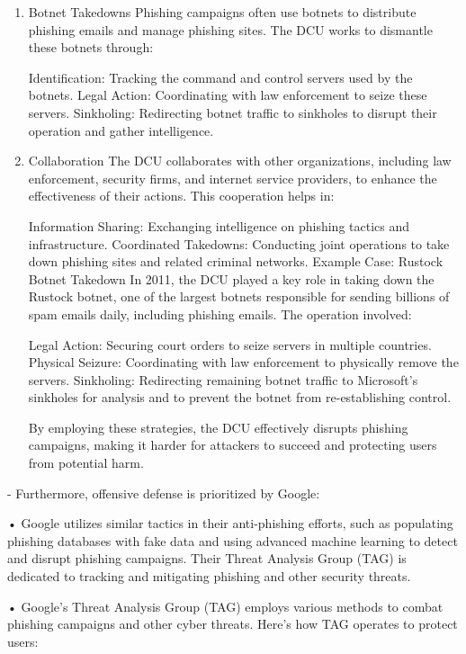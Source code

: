 \documentclass{ijitcs}
\begin{document}
\begin{itemize}
\begin{itemize}
\begin{enumerate}
    \item       Botnet Takedowns
Phishing campaigns often use botnets to distribute phishing emails and manage phishing sites. The DCU works to dismantle these botnets through:

Identification: Tracking the command and control servers used by the botnets.
Legal Action: Coordinating with law enforcement to seize these servers.
Sinkholing: Redirecting botnet traffic to sinkholes to disrupt their operation and gather intelligence.
    
    
    \item         Collaboration
The DCU collaborates with other organizations, including law enforcement, security firms, and internet service providers, to enhance the effectiveness of their actions. This cooperation helps in:

Information Sharing: Exchanging intelligence on phishing tactics and infrastructure.
Coordinated Takedowns: Conducting joint operations to take down phishing sites and related criminal networks.
Example Case: Rustock Botnet Takedown
In 2011, the DCU played a key role in taking down the Rustock botnet, one of the largest botnets responsible for sending billions of spam emails daily, including phishing emails. The operation involved:

Legal Action: Securing court orders to seize servers in multiple countries.
Physical Seizure: Coordinating with law enforcement to physically remove the servers.
Sinkholing: Redirecting remaining botnet traffic to Microsoft's sinkholes for analysis and to prevent the botnet from re-establishing control.

By employing these strategies, the DCU effectively disrupts phishing campaigns, making it harder for attackers to succeed and protecting users from potential harm.






\end{enumerate} 
\end{itemize}
\end{itemize}


- Furthermore, offensive defense is prioritized by Google:
\item  •  Google utilizes similar tactics in their anti-phishing efforts, such as populating phishing databases with fake data and using advanced machine learning to detect and disrupt phishing campaigns. Their Threat Analysis Group (TAG) is dedicated to tracking and mitigating phishing and other security threats.
\item • Google's Threat Analysis Group (TAG) employs various methods to combat phishing campaigns and other cyber threats. Here’s how TAG operates to protect users:
\end{document}
